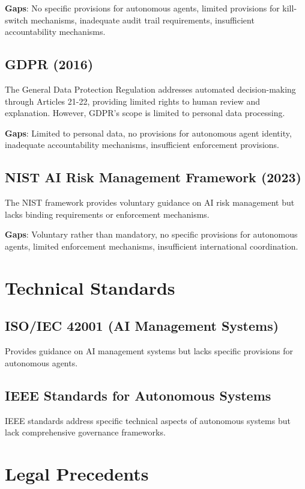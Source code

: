 \documentclass[12pt,a4paper,twoside,openright]{book}
\begin{document}
\textbf{Gaps}: No specific provisions for autonomous agents, limited provisions for kill-switch mechanisms, inadequate audit trail requirements, insufficient accountability mechanisms.

\subsection{GDPR (2016)}

The General Data Protection Regulation addresses automated decision-making through Articles 21-22, providing limited rights to human review and explanation. However, GDPR's scope is limited to personal data processing.

\textbf{Gaps}: Limited to personal data, no provisions for autonomous agent identity, inadequate accountability mechanisms, insufficient enforcement provisions.

\subsection{NIST AI Risk Management Framework (2023)}

The NIST framework provides voluntary guidance on AI risk management but lacks binding requirements or enforcement mechanisms.

\textbf{Gaps}: Voluntary rather than mandatory, no specific provisions for autonomous agents, limited enforcement mechanisms, insufficient international coordination.

\section{Technical Standards}

\subsection{ISO/IEC 42001 (AI Management Systems)}

Provides guidance on AI management systems but lacks specific provisions for autonomous agents.

\subsection{IEEE Standards for Autonomous Systems}

IEEE standards address specific technical aspects of autonomous systems but lack comprehensive governance frameworks.

\section{Legal Precedents}
\end{document}
